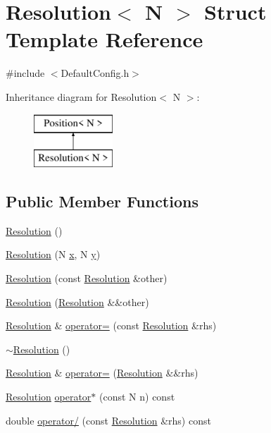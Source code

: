 \hypertarget{struct_resolution}{\section{Resolution$<$ N $>$ Struct Template Reference}
\label{struct_resolution}
}


{\ttfamily \#include $<$Default\-Config.\-h$>$}

Inheritance diagram for Resolution$<$ N $>$\-:\begin{figure}[H]
\begin{center}
\leavevmode
\includegraphics[height=2.000000cm]{struct_resolution}
\end{center}
\end{figure}
\subsection*{Public Member Functions}
\begin{DoxyCompactItemize}
\item 
\hyperlink{struct_resolution_ac30561f6544f2fc3bf481c6e0b14b461}{Resolution} ()
\item 
\hyperlink{struct_resolution_a9bb8d85e9faff270276a2e8323118fc8}{Resolution} (N \hyperlink{struct_position_af908be922fc88d89d81be7d08d06f761}{x}, N \hyperlink{struct_position_af434f54a0aad8bbfc3806ebdd197aa3b}{y})
\item 
\hyperlink{struct_resolution_a2aa8fc1f683337902dc151bada7288dd}{Resolution} (const \hyperlink{struct_resolution}{Resolution} \&other)
\item 
\hyperlink{struct_resolution_ac4d06880fbc7211f869e39cf38b0ed19}{Resolution} (\hyperlink{struct_resolution}{Resolution} \&\&other)
\item 
\hyperlink{struct_resolution}{Resolution} \& \hyperlink{struct_resolution_a717cb848dd45e1ee2454dca048b31e4f}{operator=} (const \hyperlink{struct_resolution}{Resolution} \&rhs)
\item 
\hyperlink{struct_resolution_a6cb2b5a6a911ad7cf5ecf77707c653d0}{$\sim$\-Resolution} ()
\item 
\hyperlink{struct_resolution}{Resolution} \& \hyperlink{struct_resolution_a23374340976ac8ce3fee681ea3e81c60}{operator=} (\hyperlink{struct_resolution}{Resolution} \&\&rhs)
\item 
\hyperlink{struct_resolution}{Resolution} \hyperlink{struct_resolution_ad92daf6afa258c08bfe4d910652f19a9}{operator$\ast$} (const N n) const 
\item 
double \hyperlink{struct_resolution_aa129e2a84f2bb2ff1e72845c94d95ff4}{operator/} (const \hyperlink{struct_resolution}{Resolution} \&rhs) const 
\end{DoxyCompactItemize}
